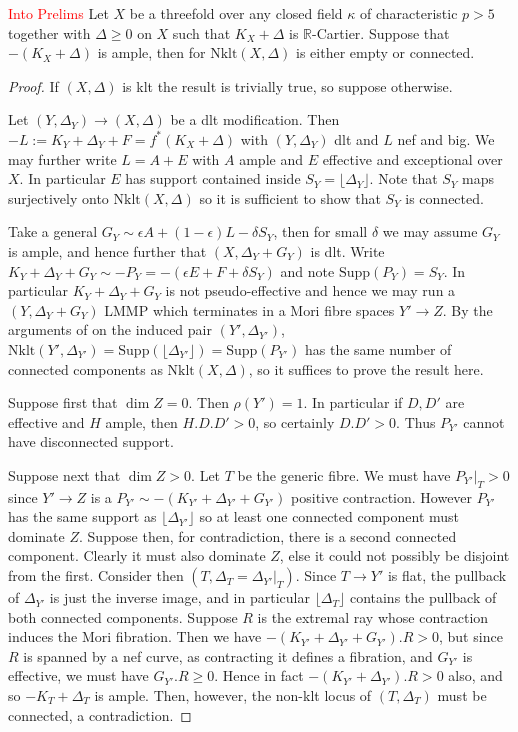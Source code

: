 \documentclass[a4paper,12pt]{book}
\newcommand{\D}{\Delta}
\newcommand{\nklt}{\text{Nklt}}
\newcommand\myworries[1]{\textcolor{red}{#1}}
\begin{document}
\begin{theorem}\myworries{Into Prelims}
	Let $X$ be a threefold over any closed field $\kappa$ of characteristic $p>5$ together with $\Delta\geq 0$ on $X$ such that $K_{X}+\Delta$ is $\mathbb{R}$-Cartier. Suppose that $-(K_{X}+\Delta)$ is ample, then for $\nklt(X,\Delta)$ is either empty or connected. 
\end{theorem}
\begin{proof}
	If $(X,\D)$ is klt the result is trivially true, so suppose otherwise.
	
	Let $(Y,\D_{Y}) \to (X,\D)$ be a dlt modification. Then $-L:=K_{Y}+\D_{Y}+F=f^{*}(K_{X}+\D)$ with $(Y,\D_{Y})$ dlt and $L$ nef and big. We may further write $L=A+E$ with $A$ ample and $E$ effective and exceptional over $X$. In particular $E$ has support contained inside $S_{Y}=\lfloor \D_{Y} \rfloor$. Note that $S_{Y}$ maps surjectively onto $\nklt(X,\D)$ so it is sufficient to show that $S_{Y}$ is connected.
	
	Take a general $G_{Y} \sim \epsilon A +(1-\epsilon) L-\delta S_{Y}$, then for small $\delta$ we may assume $G_{Y}$ is ample, and hence further that $(X,\D_{Y}+G_{Y})$ is dlt. Write $K_{Y}+\D_{Y}+G_{Y}\sim - P_{Y}=-(\epsilon E + F + \delta S_{Y})$ and note $\text{Supp}(P_{Y})=S_{Y}$. In particular $K_{Y}+\D_{Y}+G_{Y}$ is not pseudo-effective and hence we may run a $(Y,\D_{Y}+G_{Y})$ LMMP which terminates in a Mori fibre spaces $Y' \to Z$. By the arguments of \cite[Theorem 9.3]{Bir16} on the induced pair $(Y',\D_{Y'})$, $\nklt(Y',\D_{Y'})=\text{Supp}(\lfloor \D_{Y'} \rfloor)=\text{Supp}(P_{Y'})$ has the same number of connected components as $\nklt(X,\Delta)$, so it suffices to prove the result here.
	
	Suppose first that $\dim Z=0$. Then $\rho(Y')=1$. In particular if $D,D'$ are effective and $H$ ample, then $H.D.D' >0$, so certainly $D.D'>0$. Thus $P_{Y'}$ cannot have disconnected support.
	
	Suppose next that $\dim Z > 0 $. Let $T$ be the generic fibre. We must have $P_{Y'}|_{T}> 0$ since $Y' \to Z$ is a $P_{Y'}\sim -(K_{Y'}+\Delta_{Y'}+G_{Y'})$ positive contraction. However $P_{Y'}$ has the same support as $\lfloor \D_{Y'} \rfloor$ so at least one connected component must dominate $Z$. Suppose then, for contradiction, there is a second connected component. Clearly it must also dominate $Z$, else it could not possibly be disjoint from the first. Consider then $(T,\D_{T}=\D_{Y'}|_{T})$. Since $T \to Y'$ is flat, the pullback of $\D_{Y'}$ is just the inverse image, and in particular $\lfloor \D_{T} \rfloor$ contains the pullback of both connected components. Suppose $R$ is the extremal ray whose contraction induces the Mori fibration. Then we have $-(K_{Y'}+\D_{Y'}+G_{Y'}).R >0$, but since $R$ is spanned by a nef curve, as contracting it defines a fibration, and $G_{Y'}$ is effective, we must have $G_{Y'}.R \geq 0$. Hence in fact $-(K_{Y'}+\D_{Y'}).R >0$ also, and so $-K_{T}+\D_{T}$ is ample. Then, however, the non-klt locus of $(T,\D_{T})$ must be connected, a contradiction.
\end{proof}
\end{document}
